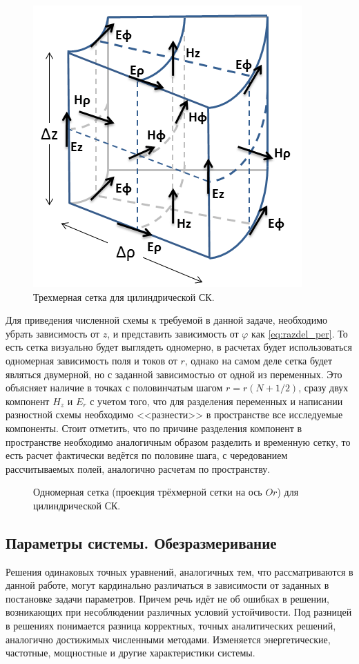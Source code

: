 \documentclass[a4paper]{article}
\begin{document}
\begin{figure}[H]\centering	
	\includegraphics[width=0.5\linewidth]{pics/FDTD_cill}
	\caption{Трехмерная сетка для цилиндрической СК.}
	\label{fig:fdtd_3d}
\end{figure}

Для приведения численной схемы к требуемой в данной задаче, необходимо убрать зависимость от $z$, и представить зависимость от $\varphi$ как \eqref{eq:razdel_per}. То есть сетка визуально будет выглядеть одномерно, в расчетах будет использоваться одномерная зависимость поля и токов от $r$, однако на самом деле сетка будет являться двумерной, но с заданной зависимостью от одной из переменных. Это объясняет наличие в точках с половинчатым шагом $r=r\left(N+1/2\right)$, сразу двух компонент $H_{z}$ и $E_{r}$ с учетом того, что для разделения переменных и написании разностной схемы необходимо <<разнести>> в пространстве все исследуемые компоненты. Стоит отметить, что по причине разделения компонент в пространстве необходимо аналогичным образом разделить и временную сетку, то есть расчет фактически ведётся по половине шага, с чередованием рассчитываемых полей, аналогично расчетам по пространству.
\begin{figure}[H]\centering
	
	\caption{Одномерная сетка (проекция трёхмерной сетки на ось $Or$) для цилиндрической СК.}
	\label{fig:fdtd_1d}
\end{figure}

\subsection{Параметры системы. Обезразмеривание}

Решения одинаковых точных уравнений, аналогичных тем, что рассматриваются в данной работе, могут кардинально различаться в зависимости от заданных в постановке задачи параметров. Причем речь идёт не об ошибках в решении, возникающих при несоблюдении различных условий устойчивости. Под разницей в  решениях понимается разница корректных, точных аналитических решений, аналогично достижимых численными методами. Изменяется энергетические, частотные, мощностные и другие характеристики системы.
\end{document}
